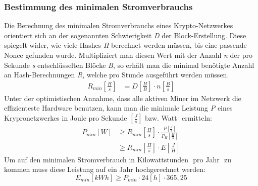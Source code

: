 \documentclass[12pt]{article}
\begin{document}
\subsubsection{Bestimmung des minimalen Stromverbrauchs}
Die Berechnung des minimalen Stromverbrauchs eines Krypto-Netzwerkes orientiert sich an der sogenannten Schwierigkeit \textit{D} der Block-Erstellung. Diese spiegelt wider, wie viele Hashes \textit{H} berechnet werden müssen, bis eine passende Nonce gefunden wurde. Multipliziert man diesen Wert mit der Anzahl \textit{n} der pro Sekunde \textit{s} entschlüsselten Blöcke \textit{B}, so erhält man die minimal benötigte Anzahl an Hash-Berechnungen \textit{R}, welche pro Stunde ausgeführt werden müssen.
\begin{align*}
    R_{min}\left[\frac{H}{s}\right]&=D\left[\frac{H}{B}\right]\cdot n\left[\frac{B}{s}\right]
\end{align*}
\clearpage
\noindent Unter der optimistischen Annahme, dass alle aktiven Miner im Netzwerk die effizienteste Hardware benutzen, kann man die minimale Leistung \textit{P} eines Krypronetzwerkes in Joule pro Sekunde \begin{math}\left[\frac{J}{s}\right]\end{math} bzw. Watt \begin{math}[W]\end{math} ermitteln:
\begin{align*}
    P_{min} [W]&\geq R_{min}\left[\frac{H}{s}\right]\cdot \frac{P\left[\frac{J}{s}\right]}{P_H\left[\frac{H}{s}\right]}\\
    &\geq R_{min}\left[\frac{H}{s}\right]\cdot E\left[\frac{J}{H}\right]
\end{align*}
Um auf den minimalen Stromverbrauch in Kilowattstunden \begin{math}[kWh]\end{math} pro Jahr \begin{math}[a]\end{math} zu kommen muss diese Leistung auf ein Jahr hochgerechnet werden:
\[ E_{min} [kWh] \geq P_{min}\cdot 24[h]\cdot 365,25\]
\end{document}
